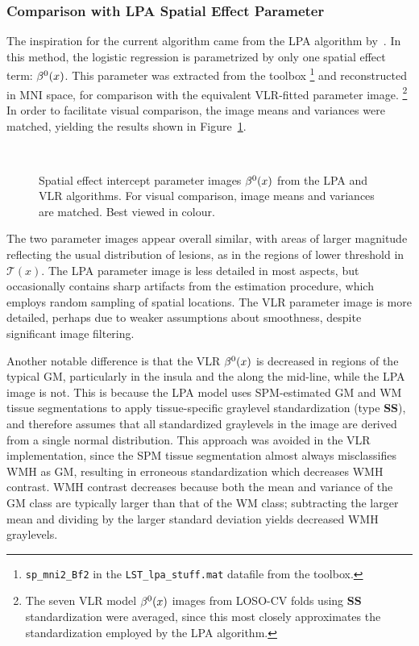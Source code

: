 \subsubsection{Comparison with LPA Spatial Effect Parameter}\label{sss:exp-beta-lpa}
The inspiration for the current algorithm came from the LPA algorithm by~\citeauthor{Schmidt2017}.
In this method, the logistic regression is parametrized by only one spatial effect term: $\beta^0(x)$.
This parameter was extracted from the toolbox%
\footnote{\texttt{sp\_mni2\_Bf2} in the \texttt{LST\_lpa\_stuff.mat} datafile from the toolbox.}
and reconstructed in MNI space, for comparison with the equivalent VLR-fitted parameter image.%
\footnote{The seven VLR model $\beta^0(x)$ images from LOSO-CV folds
  using \textbf{SS} standardization were averaged,
  since this most closely approximates the standardization employed by the LPA algorithm.}
In order to facilitate visual comparison, the image means and variances were matched,
yielding the results shown in Figure~\ref{fig:beta-lpa}.
\par
\begin{figure}
  \centering
  \\[0.5em]
  \caption{Spatial effect intercept parameter images $\beta^0(x)$ from the LPA and VLR algorithms.
    For visual comparison, image means and variances are matched. Best viewed in colour.}%
  \label{fig:beta-lpa}
\end{figure}
The two parameter images appear overall similar,
with areas of larger magnitude reflecting the usual distribution of lesions,
as in the regions of lower threshold in $\mathcal{T}(x)$.
The LPA parameter image is less detailed in most aspects,
but occasionally contains sharp artifacts from the estimation procedure,
which employs random sampling of spatial locations.
The VLR parameter image is more detailed, perhaps due to weaker assumptions about smoothness,
despite significant image filtering.
\par
Another notable difference is that the VLR $\beta^0(x)$ is decreased in regions of the typical GM,
particularly in the insula and the along the mid-line, while the LPA image is not.
This is because the LPA model uses SPM-estimated GM and WM tissue segmentations
to apply tissue-specific graylevel standardization (type \textbf{SS}), and therefore assumes that
all standardized graylevels in the image are derived from a single normal distribution.
This approach was avoided in the VLR implementation,
since the SPM tissue segmentation almost always misclassifies WMH as GM,
resulting in erroneous standardization which decreases WMH contrast.
WMH contrast decreases because both the mean and variance
of the GM class are typically larger than that of the WM class;
subtracting the larger mean and dividing by the larger standard deviation
yields decreased WMH graylevels.
